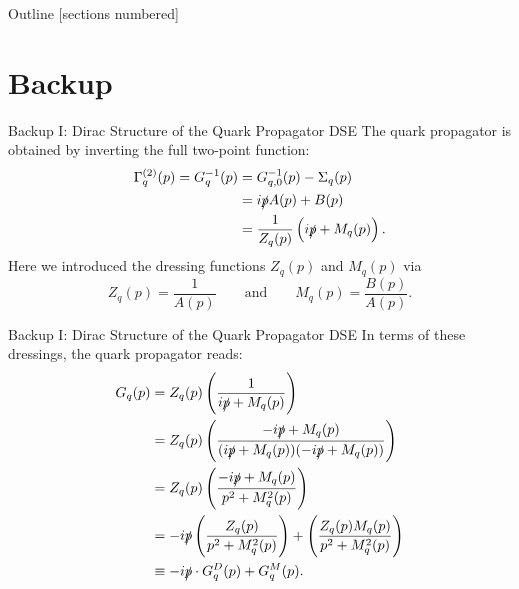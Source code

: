 \documentclass[10pt, aspectratio = 169]{beamer}
\begin{document}
\begin{frame}
\maketitle
\end{frame}

\begin{frame}{Outline}
  [sections numbered]
  \tableofcontents[hideallsubsections]
\end{frame}







\section*{Backup}
\pagestyle{empty}
\begin{frame}[noframenumbering]{Backup I: Dirac Structure of the Quark Propagator DSE}
The quark propagator is obtained by inverting the full two-point function:
\begin{equation}
\begin{aligned}
		\Gamma^{(2)}_q(p) = G^{-1}_q(p) &= G_{q,0}^{-1}(p) - \Sigma_q(p) \\
		&= i\slashed{p} A(p) + B(p) \\
		&= \frac{1}{Z_q(p)}\left(i\slashed{p} + M_q(p)\right).
\end{aligned}
\end{equation}
Here we introduced the dressing functions $Z_q(p)$ and $M_q(p)$ via
\begin{equation}
	 Z_q(p) = \frac{1}{A(p)}\qquad \text{and}\qquad M_q(p) = \frac{B(p)}{A(p)}.
\end{equation}
\end{frame}

\begin{frame}[noframenumbering]{Backup I: Dirac Structure of the Quark Propagator DSE}
In terms of these dressings, the quark propagator reads:
\begin{equation}
\begin{aligned}
	 G_q(p) &= Z_q(p)\left(\frac{1}{i\slashed{p} + M_q(p)}\right)  \\
		&= Z_q(p)\left(\frac{-i\slashed{p} + M_q(p)}{(i\slashed{p} + M_q(p))(-i\slashed{p} + M_q(p))}\right) \\
		&= Z_q(p)\left(\frac{-i\slashed{p} + M_q(p)}{p^2 + M_q^2(p)}\right) \\
		&= -i\slashed{p} \left(\frac{Z_q(p)}{p^2 + M_q^2(p)}\right) +  \left(\frac{Z_q(p)M_q(p)}{p^2 + M_q^2(p)}\right)\\
		&\equiv -i\slashed{p}\cdot G_q^D(p) + G_q^M(p).
\end{aligned} \label{eqn:quark_prop_inversion}
\end{equation}
\end{frame}
\end{document}
